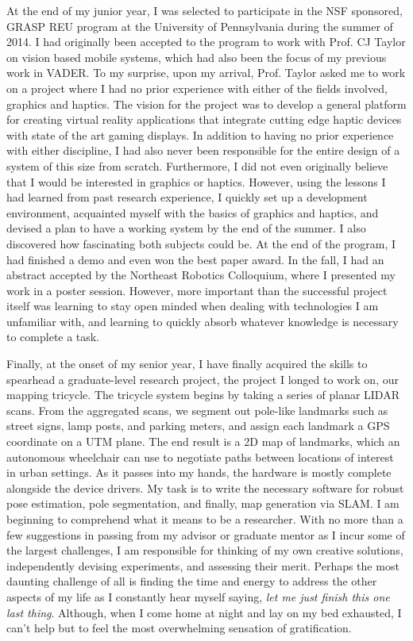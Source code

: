 \documentclass{article}
\begin{document}
At the end of my junior year, I was selected to participate in the NSF
sponsored, GRASP REU program at the University of Pennsylvania during the
summer of 2014. I had originally been accepted to the program to work with
Prof. CJ Taylor on vision based mobile systems, which had also been the focus
of my previous work in VADER. To my surprise, upon my arrival, Prof. Taylor
asked me to work on a project where I had no prior experience with either of
the fields involved, graphics and haptics. The vision for the project was to
develop a general platform for creating virtual reality applications that
integrate cutting edge haptic devices with state of the art gaming displays. In
addition to having no prior experience with either discipline, I had also never
been responsible for the entire design of a system of this size from scratch.
Furthermore, I did not even originally believe that I would be interested in
graphics or haptics.  However, using the lessons I had learned from past
research experience, I quickly set up a development environment, acquainted
myself with the basics of graphics and haptics, and devised a plan to have a
working system by the end of the summer. I also discovered how fascinating both
subjects could be. At the end of the program, I had finished a demo and even
won the best paper award. In the fall, I had an abstract accepted by the
Northeast Robotics Colloquium, where I presented my work in a poster session.
However, more important than the successful project itself was learning to stay
open minded when dealing with technologies I am unfamiliar with, and learning
to quickly absorb whatever knowledge is necessary to complete a task.

Finally, at the onset of my senior year, I have finally acquired the skills to
spearhead a graduate-level research project, the project I longed to work on,
our mapping tricycle. The tricycle system begins by taking a series of planar
LIDAR scans. From the aggregated scans, we segment out pole-like landmarks such
as street signs, lamp posts, and parking meters, and assign each landmark a GPS
coordinate on a UTM plane.  The end result is a 2D map of landmarks, which an
autonomous wheelchair can use to negotiate paths between locations of interest
in urban settings. As it passes into my hands, the hardware is mostly complete
alongside the device drivers. My task is to write the necessary software for
robust pose estimation, pole segmentation, and finally, map generation via
SLAM. I am beginning to comprehend what it means to be a researcher. With no
more than a few suggestions in passing from my advisor or graduate mentor as I
incur some of the largest challenges, I am responsible for thinking of my own
creative solutions, independently devising experiments, and assessing their
merit.  Perhaps the most daunting challenge of all is finding the time  and
energy to address the other aspects of my life as I constantly hear myself
saying, \emph{let me just finish this one last thing}. Although, when I come
home at night and lay on my bed exhausted, I can't help but to feel the most
overwhelming sensation of gratification.
\end{document}
